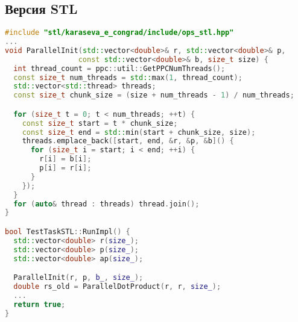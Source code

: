 \documentclass[12pt]{article}
\begin{document}
\subsection{Версия STL}
\begin{lstlisting}[language=C++]
#include "stl/karaseva_e_congrad/include/ops_stl.hpp"
...
void ParallelInit(std::vector<double>& r, std::vector<double>& p, 
                 const std::vector<double>& b, size_t size) {
  int thread_count = ppc::util::GetPPCNumThreads();
  const size_t num_threads = std::max(1, thread_count);
  std::vector<std::thread> threads;
  const size_t chunk_size = (size + num_threads - 1) / num_threads;

  for (size_t t = 0; t < num_threads; ++t) {
    const size_t start = t * chunk_size;
    const size_t end = std::min(start + chunk_size, size);
    threads.emplace_back([start, end, &r, &p, &b]() {
      for (size_t i = start; i < end; ++i) {
        r[i] = b[i];
        p[i] = r[i];
      }
    });
  }
  for (auto& thread : threads) thread.join();
}

bool TestTaskSTL::RunImpl() {
  std::vector<double> r(size_);
  std::vector<double> p(size_);
  std::vector<double> ap(size_);

  ParallelInit(r, p, b_, size_);
  double rs_old = ParallelDotProduct(r, r, size_);
  ...
  return true;
}
\end{lstlisting}
\end{document}
